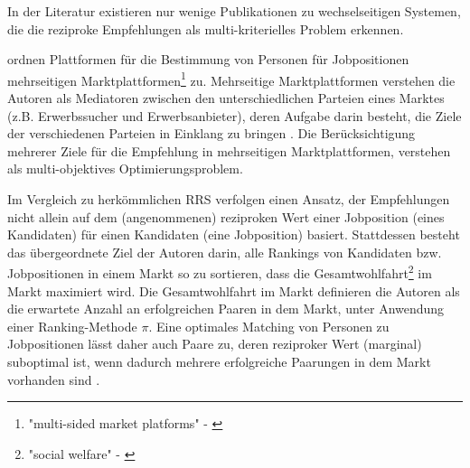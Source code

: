 In der Literatur existieren nur wenige Publikationen zu wechselseitigen Systemen, die die reziproke Empfehlungen als multi-kriterielles Problem erkennen.



\textcite[S. 329]{su:inproceedings} ordnen Plattformen für die Bestimmung von Personen für Jobpositionen mehrseitigen Marktplattformen\footnote{"multi-sided market platforms" - \textcite[S. 329]{su:inproceedings}} zu.
Mehrseitige Marktplattformen verstehen die Autoren als Mediatoren zwischen den unterschiedlichen Parteien eines Marktes (z.B. Erwerbssucher und Erwerbsanbieter), deren Aufgabe darin besteht, die Ziele der verschiedenen Parteien in Einklang zu bringen \cite[S. 329]{su:inproceedings}.
Die Berücksichtigung mehrerer Ziele für die Empfehlung in mehrseitigen Marktplattformen, verstehen \textcite[S. 329]{su:inproceedings} als multi-objektives Optimierungsproblem.

Im Vergleich zu herkömmlichen \ac{RRS} verfolgen \textcite[S. 328ff.]{su:inproceedings} einen Ansatz, der Empfehlungen nicht allein auf dem (angenommenen) reziproken Wert einer Jobposition (eines Kandidaten) für einen Kandidaten (eine Jobposition) basiert.
Stattdessen besteht das übergeordnete Ziel der Autoren darin, alle Rankings von Kandidaten bzw. Jobpositionen in einem Markt so zu sortieren, dass die Gesamtwohlfahrt\footnote{"social welfare" - \textcite[S. 329]{su:inproceedings}} im Markt maximiert wird.
Die Gesamtwohlfahrt im Markt definieren die Autoren als die erwartete Anzahl an erfolgreichen Paaren in dem Markt, unter Anwendung einer Ranking-Methode $\pi$.
Eine optimales Matching von Personen zu Jobpositionen lässt daher auch Paare zu, deren reziproker Wert (marginal) suboptimal ist, wenn dadurch mehrere erfolgreiche Paarungen in dem Markt vorhanden sind \cite[S. 334]{su:inproceedings}.

